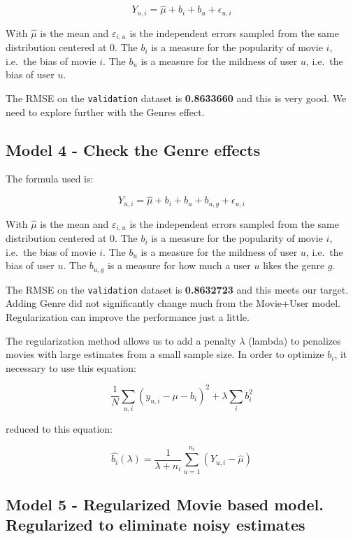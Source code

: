 \documentclass[
]{article}
\begin{document}
\[Y_{u,i} = \hat{\mu} + b_i + b_u + \epsilon_{u,i}\]

With \(\hat{\mu}\) is the mean and \(\varepsilon_{i,u}\) is the
independent errors sampled from the same distribution centered at 0. The
\(b_i\) is a measure for the popularity of movie \(i\), i.e.~the bias of
movie \(i\). The \(b_u\) is a measure for the mildness of user \(u\),
i.e.~the bias of user \(u\).

The RMSE on the \texttt{validation} dataset is \textbf{0.8633660} and
this is very good. We need to explore further with the Genres effect.

\hypertarget{model-4---check-the-genre-effects}{%
\subsection{Model 4 - Check the Genre
effects}\label{model-4---check-the-genre-effects}}

The formula used is:

\[Y_{u,i} = \hat{\mu} + b_i + b_u + b_{u,g} + \epsilon_{u,i}\]

With \(\hat{\mu}\) is the mean and \(\varepsilon_{i,u}\) is the
independent errors sampled from the same distribution centered at 0. The
\(b_i\) is a measure for the popularity of movie \(i\), i.e.~the bias of
movie \(i\). The \(b_u\) is a measure for the mildness of user \(u\),
i.e.~the bias of user \(u\). The \(b_{u,g}\) is a measure for how much a
user \(u\) likes the genre \(g\).

The RMSE on the \texttt{validation} dataset is \textbf{0.8632723} and
this meets our target. Adding Genre did not significantly change much
from the Movie+User model. Regularization can improve the performance
just a little.

The regularization method allows us to add a penalty \(\lambda\)
(lambda) to penalizes movies with large estimates from a small sample
size. In order to optimize \(b_i\), it necessary to use this equation:

\[\frac{1}{N} \sum_{u,i} (y_{u,i} - \mu - b_{i})^{2} + \lambda \sum_{i} b_{i}^2\]

reduced to this equation:

\[\hat{b_{i}} (\lambda) = \frac{1}{\lambda + n_{i}} \sum_{u=1}^{n_{i}} (Y_{u,i} - \hat{\mu}) \]

\hypertarget{model-5---regularized-movie-based-model.-regularized-to-eliminate-noisy-estimates}{%
\subsection{Model 5 - Regularized Movie based model. Regularized to
eliminate noisy
estimates}\label{model-5---regularized-movie-based-model.-regularized-to-eliminate-noisy-estimates}}
\end{document}
